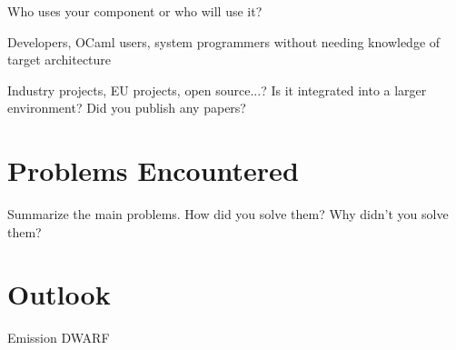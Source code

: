 Who uses your component or who will use it?

Developers, OCaml users, system programmers
without needing knowledge of target architecture


Industry projects, EU projects, open source...? Is it integrated into a larger environment? Did you publish any papers?

\section{Problems Encountered\label{sec:problems}}

Summarize the main problems. How did you solve them? Why didn't you solve them?

\section{Outlook\label{sec:outlook}}
Emission DWARF \autocite{libmond} \autocite{dwpr}

